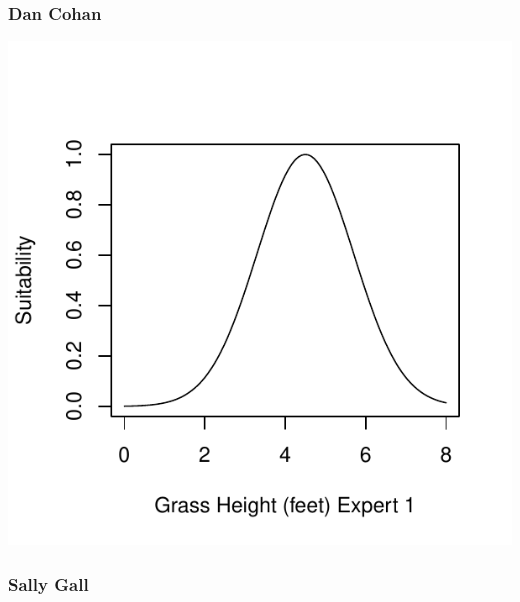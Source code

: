 \documentclass[12pt,letterpaper]{article}\usepackage{graphicx, color}
\makeatletter
\def\maxwidth{ %
  \ifdim\Gin@nat@width>\linewidth
    \linewidth
  \else
    \Gin@nat@width
  \fi
}
\newenvironment{knitrout}{}{} %
\makeatother
\begin{document}
\subsubsection{Dan Cohan}
\begin{knitrout}
\color{fgcolor}\includegraphics[width=\maxwidth]{figure/Dan_Grass_Height} 
\end{knitrout}

\subsubsection{Sally Gall}
\end{document}
